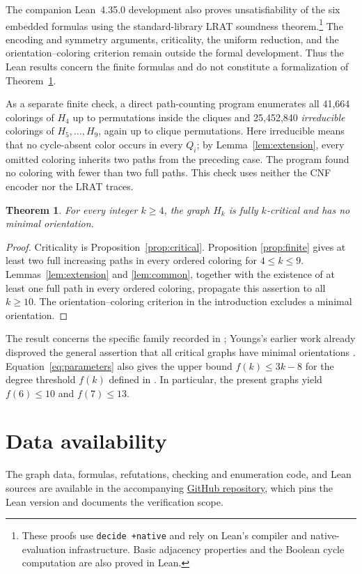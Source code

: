\documentclass[11pt]{amsart}
\newtheorem{theorem}{Theorem}
\begin{document}
The companion Lean~4.35.0 development also proves unsatisfiability of
the six embedded formulas using the standard-library LRAT soundness
theorem.\footnote{These proofs use \texttt{decide +native} and rely on
Lean's compiler and native-evaluation infrastructure.  Basic adjacency
properties and the Boolean cycle computation are also proved in Lean.}
The encoding and symmetry arguments, criticality, the uniform reduction,
and the orientation--coloring criterion remain outside the formal
development.  Thus the Lean results concern the finite formulas and
do not constitute a formalization of Theorem~\ref{thm:main}.

As a separate finite check, a direct path-counting program enumerates
all 41,664 colorings of $H_4$ up to permutations inside the cliques
and 25,452,840 \emph{irreducible} colorings of $H_5,\ldots,H_9$,
again up to clique permutations.  Here irreducible means that no
cycle-absent color occurs in every $Q_i$; by
Lemma~\ref{lem:extension}, every omitted coloring inherits two
paths from the preceding case.  The program found no coloring with
fewer than two full paths.  This check uses neither the CNF encoder
nor the LRAT traces.

\begin{theorem}\label{thm:main}
For every integer $k\geq4$, the graph $H_k$ is fully $k$-critical and
has no minimal orientation.
\end{theorem}

\begin{proof}
Criticality is Proposition~\ref{prop:critical}.  Proposition
\ref{prop:finite} gives at least two full increasing paths in every
ordered coloring for $4\leq k\leq9$.  Lemmas~\ref{lem:extension} and
\ref{lem:common}, together with the existence of at least one full
path in every ordered coloring, propagate this assertion to all
$k\geq10$.  The orientation--coloring criterion in the introduction
excludes a minimal orientation.
\end{proof}

The result concerns the specific family recorded in
\cite[\S13.8]{JT}; Youngs's earlier work already disproved the
general assertion that all critical graphs have minimal orientations
\cite{Youngs}.  Equation~\eqref{eq:parameters} also gives the upper
bound $f(k)\leq3k-8$ for the degree threshold $f(k)$ defined in
\cite[\S13.8]{JT}.  In particular, the present graphs yield
$f(6)\leq10$ and $f(7)\leq13$.

\section*{Data availability}
The graph data, formulas, refutations, checking and enumeration code,
and Lean sources are available in the accompanying
\href{https://github.com/alexgocardinal/hanson-toft-minimal-orientations}{GitHub repository},
which pins the Lean version and documents the verification scope.
\end{document}
